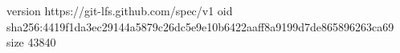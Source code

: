 version https://git-lfs.github.com/spec/v1
oid sha256:4419f1da3ec29144a5879c26dc5e9e10b6422aaff8a9199d7de865896263ca69
size 43840
